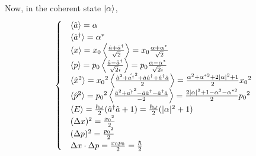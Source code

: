 \documentclass[12pt, twoside]{article}
\begin{document}
Now, in the coherent state $\ket{\alpha}$,
\begin{equation}\label{eq:coherent_stats}
\begin{cases}

	&{ \langle \hat{a} \rangle = \alpha }\\
	&{ \langle \hat{a}^\dagger \rangle = \alpha^* }\\
	&{ \langle x \rangle = x _ { 0 } \left\langle \frac { \hat{a}+ \hat{a} ^ { \dagger } } { \sqrt{2} } \right\rangle = x _ { 0 } \frac{\alpha + \alpha^*}{\sqrt{2}}}\\
	& { \langle p \rangle = p_0  \left\langle \frac { \hat{a}- \hat{a} ^ { \dagger } } { \sqrt { 2 } i } \right\rangle =  p_0 \frac{\alpha - \alpha^*}{\sqrt{2} i} }\\
	& { \langle \hat{x}^2 \rangle = {x_0}^2  \left\langle \frac { \hat{a}^2 + \hat{a^ { \dagger }}^2 + \hat{a}\hat{a}^\dagger + \hat{a}^\dagger \hat{a} } { 2 } \right\rangle =  \frac{\alpha^2 + \alpha^{*2} + 2|\alpha|^2 + 1 }{2}{x_0}^2}\\
	& { \langle \hat{p}^2 \rangle = {p_0}^2  \left\langle \frac { \hat{a}^2 + \hat{a^ { \dagger }}^2 - \hat{a}\hat{a}^\dagger - \hat{a}^\dagger \hat{a} } { -2 } \right\rangle = \frac{ 2|\alpha|^2 + 1 -\alpha^2 - \alpha^{*2} }{2}{p_0}^2}\\
	& \expval{E} = \frac{\hbar\omega}{2}(\hat{a}^{\dagger}\hat{a}+1) = \frac{\hbar\omega}{2}(|\alpha|^2 + 1)\\
	& (\Delta x)^2 = \frac{{x_0}^2}{2}\\
	& (\Delta p)^2 = \frac{{p_0}^2}{2}\\
	& \Delta x \cdot \Delta p = \frac{x_0 p_0}{2} = \frac{\hbar}{2} 
	
	\end{cases}\end{equation}
	
\end{document}
